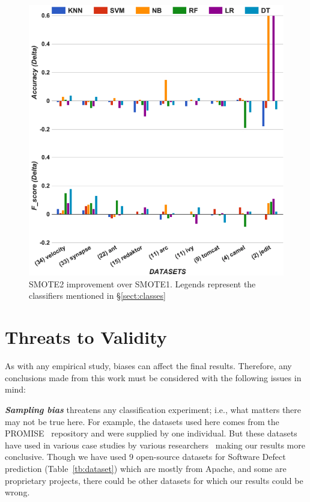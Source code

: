 \documentclass[sigconf,review, anonymous]{acmart}
\theoremstyle{break}
\theoremstyle{break}
\newcommand{\tion}[1]{{\S}\ref{sect:#1}}
\begin{document}


\begin{figure}[!htbp]
\begin{minipage}{\linewidth}
\centering
        \includegraphics[width=.95\linewidth]{./fig/acc_f_tuned.png}
    \end{minipage}%
    \caption{SMOTE2 improvement over SMOTE1. Legends represent the classifiers mentioned in \tion{classes}}
    \label{fig:threats}
\end{figure}

\section{Threats to Validity}
\label{sect:validity}

As with any empirical study, biases can affect the final
results. Therefore, any conclusions made from this work must be considered with the following issues in mind:

\textbf{\textit{Sampling bias}} threatens any classification experiment; i.e., what matters there may not be true here. For example, the datasets used here comes from the PROMISE~\cite{promiserepo} repository and were supplied by one individual. But these datasets have used in various case studies by various researchers~\cite{he2012investigation,peters2013better,peters2013balancing,turhan2013empirical} making our results more conclusive.
Though we have used 9 open-source datasets for Software Defect prediction (Table~\ref{tb:dataset}) which are mostly from Apache, and some are proprietary projects, there could be other datasets for which our results could be wrong.
\end{document}
